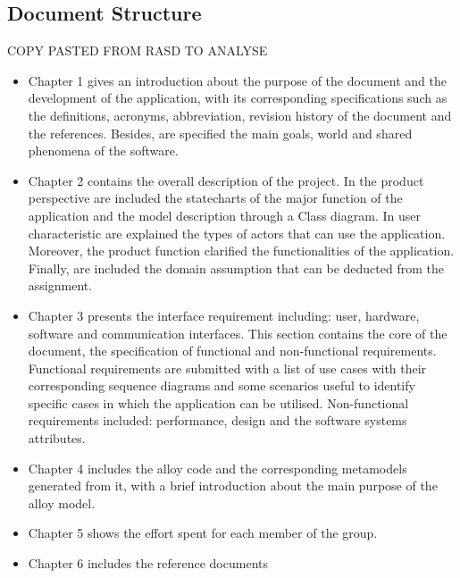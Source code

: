 \subsection{\sffamily Document Structure}
COPY PASTED FROM RASD TO ANALYSE
\begin{itemize}

\item
Chapter 1 gives an introduction about the purpose of the document and the development of the
application, with its corresponding specifications such as the definitions, acronyms, abbreviation,
revision history of the document and the references.
Besides, are specified the main goals, world and shared phenomena of the software.

\item
Chapter 2 contains the overall description of the project. In the product perspective are included
the statecharts of the major function of the application and the model description through a Class
diagram. In user characteristic are explained the types of actors that can use the application.
Moreover, the product function clarified the functionalities of the application. Finally, are included
the domain assumption that can be deducted from the assignment.

\item
Chapter 3 presents the interface requirement including: user, hardware, software and
communication interfaces. This section contains the core of the document, the specification of
functional and non-functional requirements. Functional requirements are submitted with a list of
use cases with their corresponding sequence diagrams and some scenarios useful to identify
specific cases in which the application can be utilised. Non-functional requirements included:
performance, design and the software systems attributes.

\item
Chapter 4 includes the alloy code and the corresponding metamodels generated from it, with a
brief introduction about the main purpose of the alloy model.

\item
Chapter 5 shows the effort spent for each member of the group.

\item
Chapter 6 includes the reference documents
\end{itemize}

